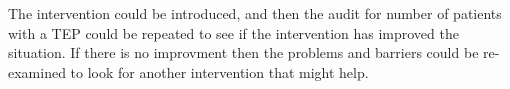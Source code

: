 \documentclass[12pt,a4paper,oneside,titlepage]{article}
\begin{document}
The intervention could be introduced, and then the audit for number of patients with 
a TEP could be repeated to see if the intervention has improved the situation. If there 
is no improvment then the problems and barriers could be re-examined to look for another
intervention that might help.

\clearpage
\printbibliography[prenote=needsfixing]
\end{document}
